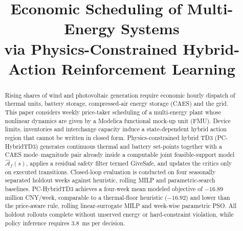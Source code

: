 \documentclass[conference]{IEEEtran}
\newcommand{\Afhat}{\widehat{\mathcal{A}}_{f}}
\begin{document}
\title{Economic Scheduling of Multi-Energy Systems\\via Physics-Constrained Hybrid-Action Reinforcement Learning}

\author{
\and
{}
}

\maketitle

\begin{abstract}
Rising shares of wind and photovoltaic generation require economic hourly dispatch of thermal units, battery storage, compressed-air energy storage (CAES) and the grid. This paper considers weekly price-taker scheduling of a multi-energy plant whose nonlinear dynamics are given by a Modelica functional mock-up unit (FMU). Device limits, inventories and interchange capacity induce a state-dependent hybrid action region that cannot be written in closed form. Physics-constrained hybrid TD3 (PC-HybridTD3) generates continuous thermal and battery set-points together with a CAES mode--magnitude pair already inside a computable joint feasible-support model \(\Afhat(s)\), applies a residual safety filter termed GiveSafe, and updates the critics only on executed transitions. Closed-loop evaluation is conducted on four seasonally separated holdout weeks against heuristic, rolling MILP and parametric-search baselines. PC-HybridTD3 achieves a four-week mean modeled objective of \(-16.89\) million CNY/week, comparable to a thermal-floor heuristic (\(-16.92\)) and lower than the price-aware rule, rolling linear-surrogate MILP and week-wise parametric PSO. All holdout rollouts complete without unserved energy or hard-constraint violation, while policy inference requires \(3.8\)~ms per decision.
\end{abstract}
\end{document}
